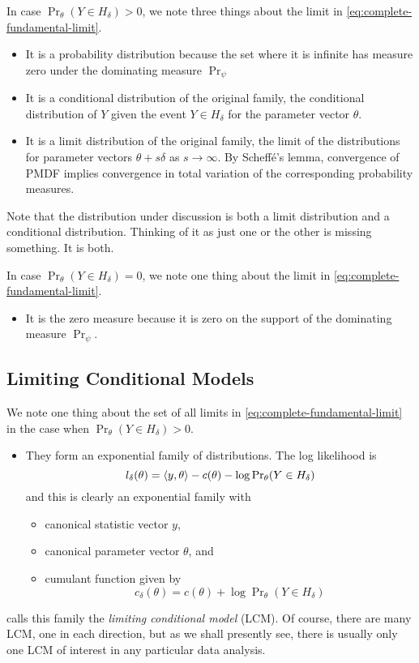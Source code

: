 In case $\Pr_\theta(Y \in H_\delta) > 0$,
we note three things about the limit in \eqref{eq:complete-fundamental-limit}.
\begin{itemize}
\item It is a probability distribution because the set where it is infinite
    has measure zero under the dominating measure $\Pr_\psi$
\item It is a conditional distribution of the original family,
    the conditional distribution of $Y$ given the event $Y \in H_\delta$
    for the parameter vector $\theta$.
\item It is a limit distribution of the original family,
    the limit of the distributions for parameter vectors $\theta + s \delta$
    as $s \to \infty$.  By Scheff\'{e}'s lemma, convergence of PMDF implies
    convergence in total variation of the corresponding probability measures.
\end{itemize}
Note that the distribution under discussion is both a limit distribution
and a conditional distribution.  Thinking of it as just one or the other
is missing something.  It is both.

In case $\Pr_\theta(Y \in H_\delta) = 0$,
we note one thing about the limit in \eqref{eq:complete-fundamental-limit}.
\begin{itemize}
\item It is the zero measure because it is zero on the support of
the dominating measure $\Pr_\psi$.
\end{itemize}

\subsection{Limiting Conditional Models}

We note one thing about the set of all limits
in \eqref{eq:complete-fundamental-limit}
in the case when $\Pr_\theta(Y \in H_\delta) > 0$.
\begin{itemize}
\item They form an exponential family of distributions.  The log likelihood is
\begin{equation} \label{eq:logl-expfam-lcm}
   l_\delta(\theta) =
   \langle y, \theta \rangle - c(\theta) - \log \Pr\nolimits_\theta(Y \in H_\delta)
\end{equation}
and this is clearly an exponential family with
\begin{itemize}
\item canonical statistic vector $y$,
\item canonical parameter vector $\theta$, and
\item cumulant function given by
\begin{equation} \label{eq:cumfun-lcm}
   c_\delta(\theta) = c(\theta) + \log \Pr\nolimits_\theta(Y \in H_\delta)
\end{equation}
\end{itemize}
\end{itemize}
\citet{geyer-gdor} calls this family the \emph{limiting conditional model}
(LCM).  Of course, there are many LCM, one in each direction, but as we
shall presently see, there is usually only one LCM of interest
in any particular data analysis.

